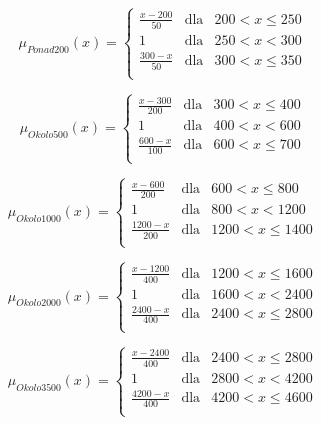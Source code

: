 \documentclass{classrep}
\begin{document}
\begin{equation}
\mu _{Ponad200}(x) = \left\{ \begin{array}{rcl}
\frac{x - 200}{50} & \mbox{dla} & 200 < x \leq 250\\
1 & \mbox{dla} & 250 < x < 300\\
\frac{300 - x}{50} & \mbox{dla} & 300 < x \leq 350\\
\end{array}\right.
\end{equation}

\begin{equation}
\mu _{Okolo500}(x) = \left\{ \begin{array}{rcl}
\frac{x - 300}{200} & \mbox{dla} & 300 < x \leq 400\\
1 & \mbox{dla} & 400 < x < 600\\
\frac{600 - x}{100} & \mbox{dla} & 600 < x \leq 700\\
\end{array}\right.
\end{equation}

\begin{equation}
\mu _{Okolo1000}(x) = \left\{ \begin{array}{rcl}
\frac{x - 600}{200} & \mbox{dla} & 600 < x \leq 800\\
1 & \mbox{dla} & 800 < x < 1200\\
\frac{1200 - x}{200} & \mbox{dla} & 1200 < x \leq 1400\\
\end{array}\right.
\end{equation}

\begin{equation}
\mu _{Okolo2000}(x) = \left\{ \begin{array}{rcl}
\frac{x - 1200}{400} & \mbox{dla} & 1200 < x \leq 1600\\
1 & \mbox{dla} & 1600 < x < 2400\\
\frac{2400 - x}{400} & \mbox{dla} & 2400 < x \leq 2800\\
\end{array}\right.
\end{equation}

\begin{equation}
\mu _{Okolo3500}(x) = \left\{ \begin{array}{rcl}
\frac{x - 2400}{400} & \mbox{dla} & 2400 < x \leq 2800\\
1 & \mbox{dla} & 2800 < x < 4200\\
\frac{4200 - x}{400} & \mbox{dla} & 4200 < x \leq 4600\\
\end{array}\right.
\end{equation}
\end{document}
